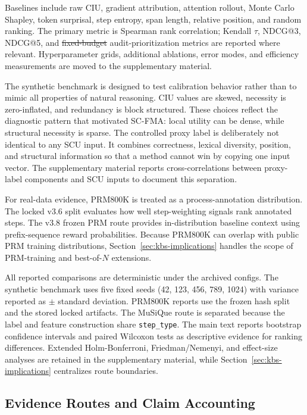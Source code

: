 \documentclass[a4paper,fleqn]{cas-sc}
\makeatletter
\newcommand{\fixedBudget}{\mbox{fixed-budget}} %
\providecommand{\DIFaddtex}[1]{{\protect\color{blue}\uwave{#1}}} %
\providecommand{\DIFdeltex}[1]{{\protect\color{red}\sout{#1}}} %
\providecommand{\DIFaddbegin}{} %
\providecommand{\DIFaddend}{} %
\providecommand{\DIFdelbegin}{} %
\providecommand{\DIFdelend}{} %
\providecommand{\DIFadd}[1]{\texorpdfstring{\DIFaddtex{#1}}{#1}} %
\providecommand{\DIFdel}[1]{\texorpdfstring{\DIFdeltex{#1}}{}} %
\providecommand{\DIFscaledelfig}{0.5}
\newlength{\DIFdelgraphicswidth} %
\newlength{\DIFdelgraphicsheight} %
\providecommand{\DIFaddincludegraphics}[2][]{{\color{blue}\fbox{\DIFOincludegraphics[#1]{#2}}}} %
\providecommand{\DIFdelincludegraphics}[2][]{%
\sbox{\DIFdelgraphicsbox}{\DIFOincludegraphics[#1]{#2}}%
\settoboxwidth{\DIFdelgraphicswidth}{\DIFdelgraphicsbox} %
\settoboxtotalheight{\DIFdelgraphicsheight}{\DIFdelgraphicsbox} %
\scalebox{\DIFscaledelfig}{%
\parbox[b]{\DIFdelgraphicswidth}{\usebox{\DIFdelgraphicsbox}\\[-\baselineskip] \rule{\DIFdelgraphicswidth}{0em}}\llap{\resizebox{\DIFdelgraphicswidth}{\DIFdelgraphicsheight}{%
\setlength{\unitlength}{\DIFdelgraphicswidth}%
\begin{picture}(1,1)%
\thicklines\linethickness{2pt} %
{\color[rgb]{1,0,0}\put(0,0){\framebox(1,1){}}}%
{\color[rgb]{1,0,0}\put(0,0){\line( 1,1){1}}}%
{\color[rgb]{1,0,0}\put(0,1){\line(1,-1){1}}}%
\end{picture}%
}\hspace*{3pt}}} %
} %
\DeclareRobustCommand{\DIFaddbegin}{\DIFOaddbegin \let\includegraphics\DIFaddincludegraphics} %
\DeclareRobustCommand{\DIFaddend}{\DIFOaddend \let\includegraphics\DIFOincludegraphics} %
\DeclareRobustCommand{\DIFdelbegin}{\DIFOdelbegin \let\includegraphics\DIFdelincludegraphics} %
\DeclareRobustCommand{\DIFdelend}{\DIFOaddend \let\includegraphics\DIFOincludegraphics} %
\let\sout@orig\sout %
\renewcommand{\sout}[1]{\ifmmode\text{\sout@orig{\ensuremath{#1}}}\else\sout@orig{#1}\fi} %
\makeatother
\begin{document}
Baselines include raw CIU, gradient attribution, attention rollout, Monte Carlo Shapley, token surprisal, step entropy, span length, relative position, and random ranking. The primary metric is Spearman rank correlation; Kendall $\tau$, NDCG@3, NDCG@5, and \DIFdelbegin \DIFdel{fixed-budget }\DIFdelend \DIFaddbegin \DIFadd{\fixedBudget{} }\DIFaddend audit-prioritization metrics are reported where relevant. Hyperparameter grids, additional ablations, error modes, and efficiency measurements are moved to the supplementary material.

The synthetic benchmark is designed to test calibration behavior rather than to mimic all properties of natural reasoning. CIU values are skewed, necessity is zero-inflated, and redundancy is block structured. These choices reflect the diagnostic pattern that motivated SC-FMA: local utility can be dense, while structural necessity is sparse. The controlled proxy label is deliberately not identical to any SCU input. It combines correctness, lexical diversity, position, and structural information so that a method cannot win by copying one input vector. The supplementary material reports cross-correlations between proxy-label components and SCU inputs to document this separation.

For real-data evidence, PRM800K is treated as a process-annotation distribution. The locked v3.6 split evaluates how well step-weighting signals rank annotated steps. The v3.8 frozen PRM route provides in-distribution baseline context using prefix-sequence reward probabilities. Because PRM800K can overlap with public PRM training distributions, Section~\ref{sec:kbs-implications} handles the scope of PRM-training and best-of-\DIFdelbegin \DIFdel{$N$ }\DIFdelend \DIFaddbegin \DIFadd{\(N\) }\DIFaddend extensions.

All reported comparisons are deterministic under the archived configs. The synthetic benchmark uses five fixed seeds (42, 123, 456, 789, 1024) with variance reported as $\pm$ standard deviation. PRM800K reports use the frozen hash split and the stored locked artifacts. The MuSiQue route is separated because the label and feature construction share \texttt{step\_type}. The main text reports bootstrap confidence intervals and paired Wilcoxon tests as descriptive evidence for ranking differences. Extended Holm-Bonferroni, Friedman/Nemenyi, and effect-size analyses are retained in the supplementary material, while Section~\ref{sec:kbs-implications} centralizes route boundaries.

\subsection{Evidence Routes and Claim Accounting}
\end{document}
